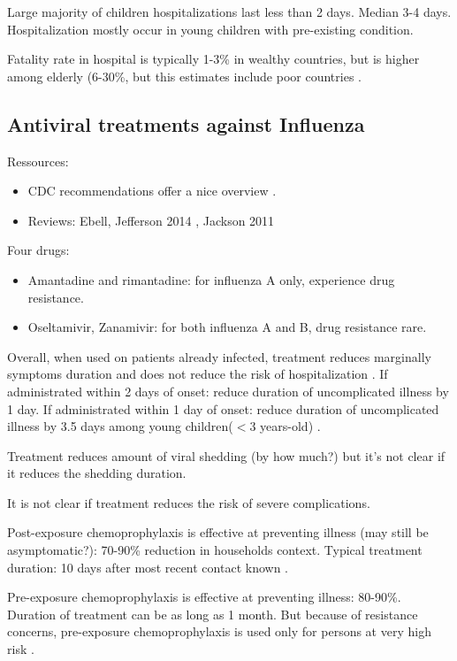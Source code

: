 \documentclass[11pt, onecolumn]{article}
\begin{document}
Large majority of children hospitalizations last less than 2 days. Median 3-4 days. Hospitalization mostly occur in young children with pre-existing condition.

Fatality rate in hospital is typically 1-3\% in wealthy countries, but is higher among elderly (6-30\%, but this estimates include poor countries \cite{Wong:2015bb}.


\subsection{Antiviral treatments against Influenza }
\label{sec:antiviral}
Ressources:
\begin{itemize}
\item  CDC recommendations offer a nice overview \cite{CDC:2011wq}.
\item Reviews: Ebell\cite{Ebell:2014ic},  Jefferson 2014 \cite{Jefferson:2014ei}, Jackson 2011 \cite{Jackson:2011ff}
\end{itemize}

Four drugs: 
\begin{itemize}
\item Amantadine and rimantadine: for influenza A only, experience drug resistance.
\item Oseltamivir, Zanamivir: for both influenza A and B, drug resistance rare.
\end{itemize}

Overall, when used on patients already infected, treatment reduces marginally symptoms duration and does not reduce the risk of hospitalization \cite{Ebell:2014ic,Jefferson:2014ei}. 
If administrated within 2 days of onset: reduce duration of uncomplicated illness by 1 day.
If administrated within 1 day of onset: reduce duration of uncomplicated illness by 3.5 days among young children($<3$ years-old) \cite{CDC:2011wq}.

Treatment reduces amount of viral shedding (by how much?) but it's not clear if it reduces the shedding duration.

It is not clear if treatment reduces the risk of severe complications.

Post-exposure chemoprophylaxis is effective at preventing illness (may still be asymptomatic?): 70-90\% reduction in households context. Typical treatment duration: 10 days after most recent contact known \cite{CDC:2011wq}.

Pre-exposure chemoprophylaxis is effective at preventing illness: 80-90\%. Duration of treatment can be as long as 1 month. But because of resistance concerns, pre-exposure chemoprophylaxis is used only for persons at very high risk \cite{CDC:2011wq}. 
\end{document}
